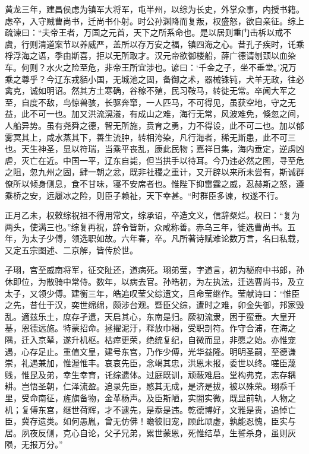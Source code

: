 \documentclass[12pt,UTF8]{ctexbook}
\begin{document}
黄龙三年，建昌侯虑为镇军大将军，屯半州，以综为长史，外掌众事，内授书籍。虑卒，入守贼曹尚书，迁尚书仆射。时公孙渊降而复叛，权盛怒，欲自亲征。综上疏谏曰：“夫帝王者，万国之元首，天下之所系命也。是以居则重门击柝以戒不虞，行则清道案节以养威严，盖所以存万安之福，镇四海之心。昔孔子疾时，讬乘桴浮海之语，季由斯喜，拒以无所取才。汉元帝欲御楼船，薛广德请刎颈以血染车。何则？水火之险至危，非帝王所宜涉也。谚曰：‘千金之子，坐不垂堂。’况万乘之尊乎？今辽东戎貊小国，无城池之固，备御之术，器械铢钝，犬羊无政，往必禽克，诚如明诏。然其方土寒确，谷稼不殖，民习鞍马，转徙无常。卒闻大军之至，自度不敌，鸟惊兽骇，长驱奔窜，一人匹马，不可得见，虽获空地，守之无益，此不可一也。加又洪流滉瀁，有成山之难，海行无常，风波难免，倏忽之间，人船异势。虽有尧舜之德，智无所施，贲育之勇，力不得设，此不可二也。加以郁雾冥其上，咸水蒸其下，善生流肿，转相洿染，凡行海者，稀无斯患，此不可三也。天生神圣，显以符瑞，当乘平丧乱，康此民物；嘉祥日集，海内垂定，逆虏凶虐，灭亡在近。中国一平，辽东自毙，但当拱手以待耳。今乃违必然之图，寻至危之阻，忽九州之固，肆一朝之忿，既非社稷之重计，又开辟以来所未尝有，斯诚群僚所以倾身侧息，食不甘味，寝不安席者也。惟陛下抑雷霆之威，忍赫斯之怒，遵乘桥之安，远履冰之险，则臣子赖祉，天下幸甚。“时群臣多谏，权遂不行。

正月乙未，权敕综祝祖不得用常文，综承诏，卒造文义，信辞粲烂。权曰：“复为两头，使满三也。”综复再祝，辞令皆新，众咸称善。赤乌三年，徙选曹尚书。五年，为太子少傅，领选职如故。六年春，卒。凡所著诗赋难论数万言，名曰私载，又定五宗图述、二京解，皆传於世。

子珝，宫至威南将军，征交阯还，道病死。珝弟莹，字道言，初为秘府中书郎，孙休即位，为散骑中常侍。数年，以病去官。孙皓初，为左执法，迁选曹尚书，及立太子，又领少傅。建衡三年，皓追叹莹父综遗文，且命莹继作。莹献诗曰：“惟臣之先，昔仕于汉，奕世绵绵，颇涉台观。暨臣父综，遭时之难，卯金失御，邦家毁乱。適兹乐土，庶存孑遗，天启其心，东南是归。厥初流隶，困于蛮垂。大皇开基，恩德远施。特蒙招命。拯擢泥汙，释放巾褐，受职剖符。作守合浦，在海之隅，迁入京辇，遂升机枢。枯瘁更荣，绝统复纪，自微而显，非愿之始。亦惟宠遇，心存足止。重值文皇，建号东宫，乃作少傅，光华益隆。明明圣嗣，至德谦崇，礼遇兼加，惟渥惟丰。哀哀先臣，念竭其忠，洪恩未报，委世以终。嗟臣蔑贱，惟昆及弟，幸生幸育，讬综遗体。过庭既训，顽蔽难启。堂构弗克，志存耦耕。岂悟圣朝，仁泽流盈。追录先臣，愍其无成，是济是拔，被以殊荣。珝忝千里，受命南征，旌旗备物，金革杨声。及臣斯陋，实闇实微，既显前轨，人物之机；复傅东宫，继世荷辉，才不逮先，是忝是违。乾德博好，文雅是贵，追悼亡臣，冀存遗类。如何愚胤，曾无仿佛！瞻彼旧宠，顾此顽虚，孰能忍愧，臣实与居。夙夜反侧，克心自论，父子兄弟，累世蒙恩，死惟结草，生誓杀身，虽则灰陨，无报万分。”
\end{document}

